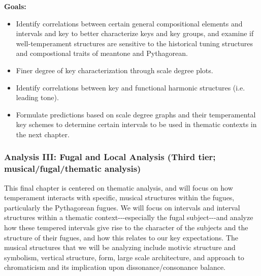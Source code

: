 \textbf{Goals:}

\begin{itemize}
\tightlist
\item
  Identify correlations between certain general compositional elements
  and intervals and key to better characterize keys and key groups, and
  examine if well-temperament structures are sensitive to the historical
  tuning structures and compostional traits of meantone and Pythagorean.
\item
  Finer degree of key characterization through scale degree plots.
\item
  Identify correlations between key and functional harmonic structures
  (i.e. leading tone).
\item
  Formulate predictions based on scale degree graphs and their
  temperamental key schemes to determine certain intervals to be used in
  thematic contexts in the next chapter.
\end{itemize}

\subsubsection{Analysis III: Fugal and Local Analysis (Third tier;
musical/fugal/thematic
analysis)}\label{analysis-iii-fugal-and-local-analysis-third-tier-musicalfugalthematic-analysis}

This final chapter is centered on thematic analysis, and will focus on
how temperament interacts with specific, musical structures within the
fugues, particularly the Pythagorean fugues. We will focus on intervals
and interval structures within a thematic context-\/-\/-especially the
fugal subject-\/-\/-and analyze how these tempered intervals give rise
to the character of the subjects and the structure of their fugues, and
how this relates to our key expectations. The musical structures that we
will be analyzing include motivic structure and symbolism, vertical
structure, form, large scale architecture, and approach to chromaticism
and its implication upon dissonance/consonance balance.

